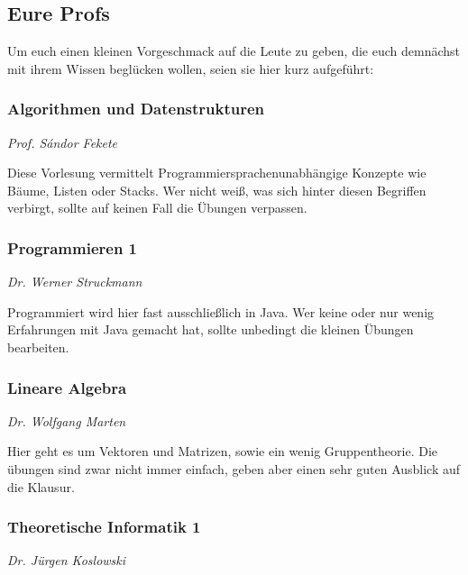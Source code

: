 \begin{multicols}{2}
\subsection{Eure Profs}
	Um euch einen kleinen Vorgeschmack auf die Leute zu geben, die euch demnächst mit ihrem Wissen beglücken wollen, seien sie hier kurz aufgeführt:

\subsubsection{Algorithmen und Datenstrukturen}
	\textit{Prof. S\'andor Fekete}

	Diese Vorlesung vermittelt Programmiersprachenunabhängige Konzepte wie Bäume, Listen oder Stacks. Wer nicht weiß, was sich hinter diesen Begriffen verbirgt, sollte auf keinen Fall die Übungen verpassen.

\subsubsection{Programmieren 1}
	\textit{Dr. Werner Struckmann}
	
	Programmiert wird hier fast ausschließlich in Java. Wer keine oder nur wenig Erfahrungen mit Java gemacht hat, sollte unbedingt die kleinen Übungen bearbeiten.

\subsubsection{Lineare Algebra}
	\textit{Dr. Wolfgang Marten}

	Hier geht es um Vektoren und Matrizen, sowie ein wenig Gruppentheorie. Die übungen sind zwar nicht immer einfach, geben aber einen sehr guten Ausblick auf die Klausur.

\subsubsection{Theoretische Informatik 1}
	\textit{Dr. Jürgen Koslowski}


\end{multicols}
